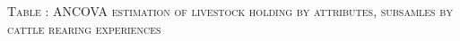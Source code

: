 \vspace{-1cm}\hspace{-1cm}\begin{minipage}[t]{14cm}
\hfil\textsc{\normalsize Table \thetable: ANCOVA estimation of livestock holding by attributes, subsamles by cattle rearing experiences\label{tab ANCOVA livestock holding Experience attributes}}\\
\setlength{\tabcolsep}{1pt}
\setlength{\baselineskip}{8pt}
\renewcommand{\arraystretch}{.52}
\hfil{}\\
\end{minipage}

